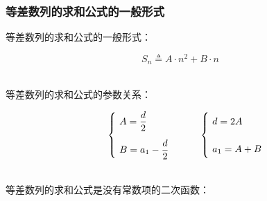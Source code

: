 \documentclass[UTF8]{ctexart}
\begin{document}
\newpage

\subsubsection{等差数列的求和公式的一般形式}
    \setcounter{equation}{0}
    等差数列的求和公式的一般形式：
    \begin{large}
        \begin{equation*}
            S_n\triangleq A\cdot n^2+B\cdot n
        \end{equation*}
    \end{large}\\
    等差数列的求和公式的参数关系：
    \begin{large}
        \begin{equation*}
            ~~~~~~
            \begin{cases}
                ~A=\dfrac{d}{2}\\[4mm]
                ~B=a_1-\dfrac{d}{2}
            \end{cases}~~~~~~
            \begin{cases}
                ~d=2A\vphantom{\dfrac{1}{1}}\\[4mm]
                ~a_1=A+B\vphantom{\dfrac{1}{1}}
            \end{cases}
        \end{equation*}
    \end{large}\\
    等差数列的求和公式是没有常数项的二次函数：
\end{document}
